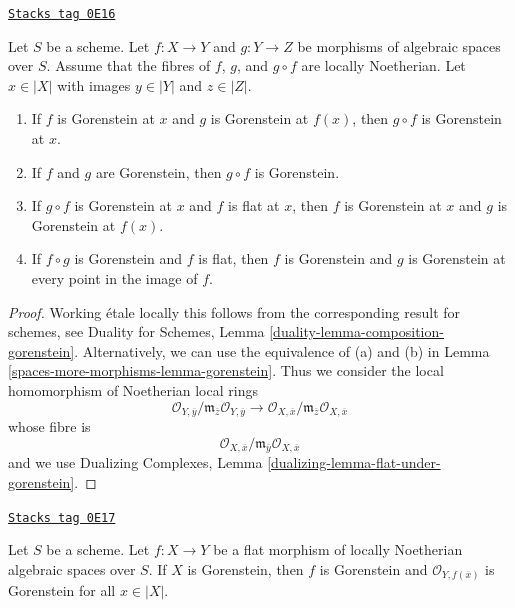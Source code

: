 \begin{lemma}
\label{spaces-more-morphisms-lemma-composition-gorenstein}
\href{https://stacks.math.columbia.edu/tag/0E16}{\texttt{Stacks tag 0E16}}

Let $S$ be a scheme.
Let $f : X \to Y$ and $g : Y \to Z$ be morphisms of algebraic spaces
over $S$. Assume that the
fibres of $f$, $g$, and $g \circ f$ are locally Noetherian.
Let $x \in |X|$ with images $y \in |Y|$ and $z \in |Z|$.
\begin{enumerate}
\item If $f$ is Gorenstein at $x$ and $g$ is Gorenstein
at $f(x)$, then $g \circ f$ is Gorenstein at $x$.
\item If $f$ and $g$ are Gorenstein, then $g \circ f$ is Gorenstein.
\item If $g \circ f$ is Gorenstein at $x$ and $f$ is flat at $x$,
then $f$ is Gorenstein at $x$ and $g$ is Gorenstein at $f(x)$.
\item If $f \circ g$ is Gorenstein and $f$ is flat, then
$f$ is Gorenstein and $g$ is Gorenstein at every point in
the image of $f$.
\end{enumerate}
\end{lemma}

\begin{proof}
Working \'etale locally this follows from the corresponding result for
schemes, see Duality for Schemes, Lemma
\ref{duality-lemma-composition-gorenstein}.
Alternatively, we can use the equivalence of (a) and (b) in
Lemma \ref{spaces-more-morphisms-lemma-gorenstein}. Thus we consider the local homomorphism
of Noetherian local rings
$$
\mathcal{O}_{Y, \overline{y}}/
\mathfrak m_{\overline{z}}\mathcal{O}_{Y, \overline{y}}
\longrightarrow
\mathcal{O}_{X, \overline{x}}/
\mathfrak m_{\overline{z}}\mathcal{O}_{X, \overline{x}}
$$
whose fibre is
$$
\mathcal{O}_{X, \overline{x}}/
\mathfrak m_{\overline{y}}\mathcal{O}_{X, \overline{x}}
$$
and we use Dualizing Complexes, Lemma
\ref{dualizing-lemma-flat-under-gorenstein}.
\end{proof}

\begin{lemma}
\label{spaces-more-morphisms-lemma-flat-morphism-from-gorenstein}
\href{https://stacks.math.columbia.edu/tag/0E17}{\texttt{Stacks tag 0E17}}

Let $S$ be a scheme.
Let $f : X \to Y$ be a flat morphism of locally Noetherian
algebraic spaces over $S$.
If $X$ is Gorenstein, then $f$ is Gorenstein and
$\mathcal{O}_{Y, f(\overline{x})}$ is Gorenstein for all $x \in |X|$.
\end{lemma}

